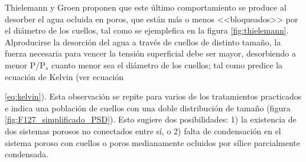 			Thielemann \cite{Thielemann2011} y Groen\cite{Groen2003} proponen que este último comportamiento se produce al desorber el agua ocluida en poros, que están más o menos <<bloqueados>> por el diámetro de los cuellos, tal como se ejemplefica en la figura \ref{fig:thielemann}. Al\space producirse la desorción del agua a través de cuellos de distinto tamaño, la fuerza  necesaria para vencer la tensión superficial debe ser mayor, desorbiendo a menor P/P$_s$ cuanto menor sea el diámetro de los cuellos; tal como predice la ecuación de Kelvin (ver ecuación {\ref{eq:kelvin}). Esta observación se repite para varios de los tratamientos practicados e indica una población de cuellos con una doble distribución de tamaño (figura \ref{fig:F127_simplificado_PSD}). Esto sugiere dos posibilidades: 1) la existencia de dos sistemas porosos no conectados entre sí, o 2) falta de condensación en el sistema poroso con cuellos o poros medianamente ocluidos por sílice parcialmente condensada.

}
